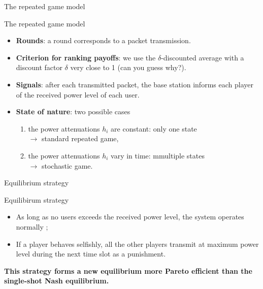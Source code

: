 \begin{frame}{The repeated game model}
    \begin{exampleblock}{The repeated game model}
        \begin{itemize}
            \pause
            \item \textbf{Rounds}: a round corresponds to a packet transmission.
            \pause
            \item \textbf{Criterion for ranking payoffs}: we use the $\delta$-discounted average with a
            discount factor $\delta$ very close to 1 (can you guess why?).
            \pause
            \item \textbf{Signals}: after each transmitted packet, the base station informs each player
            of the received power level of each user.
            \pause
            \item \textbf{State of nature}: two possible cases
            \begin{enumerate}
                \pause
                \item the power attenuations $h_i$ are constant: only one state\\
                $\to$ standard repeated game,
                \pause
                \item the power attenuations $h_i$ vary in time: mmultiple states\\
                $\to$ stochastic game.
            \end{enumerate}
        \end{itemize}
    \end{exampleblock}
\end{frame}


\begin{frame}{Equilibrium strategy}
    \begin{block}{Equilibirum strategy}
        \begin{itemize}
            \item As long as no users exceeds the received power level, the system operates normally ;
            \item If a player behaves selfishly, all the other players transmit at maximum power level
            during the next time slot as a punishment.
        \end{itemize}
    \end{block}

    \vspace{0.5cm}
    \textbf{{\color{green}This strategy forms a new equilibrium more Pareto efficient than the
    single-shot Nash equilibrium.}}
\end{frame}
